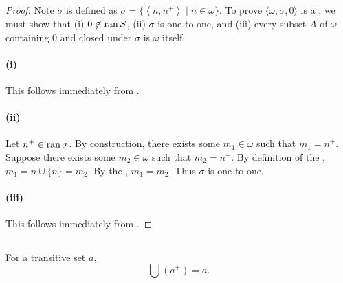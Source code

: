 \documentclass{report}
\newcommand{\pair}[1]{\left< #1 \right>}
\begin{document}
\begin{proof}


  Note $\sigma$ is defined as $\sigma = \{\pair{n, n^+} \mid n \in \omega\}$.
  To prove $\langle \omega, \sigma, 0 \rangle$ is a ,
    we must show that (i) $0 \not\in \mathop{\text{ran}}{S}$, (ii) $\sigma$ is one-to-one, and
    (iii) every subset $A$ of $\omega$ containing $0$ and closed under $\sigma$
    is $\omega$ itself.

  \paragraph{(i)}%

    This follows immediately from .

  \paragraph{(ii)}%

    Let $n^+ \in \mathop{\text{ran}}{\sigma}$.
    By construction, there exists some $m_1 \in \omega$ such that $m_1 = n^+$.
    Suppose there exists some $m_2 \in \omega$ such that $m_2 = n^+$.
    By definition of the , $m_1 = n \cup \{n\} = m_2$.
    By the , $m_1 = m_2$.
    Thus $\sigma$ is one-to-one.

  \paragraph{(iii)}%

    This follows immediately from .

\end{proof}

\subsection{}%

\begin{theorem}[4E]

  For a transitive set $a$, $$\bigcup \left(a^+\right) = a.$$

\end{theorem}
\end{document}

